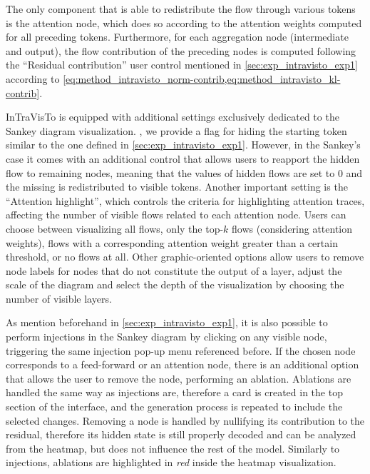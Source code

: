 The only component that is able to redistribute the flow through various tokens is the attention node, which does so according to the attention weights computed for all preceding tokens.
Furthermore, for each aggregation node (intermediate and output), the flow contribution of the preceding nodes is computed following the ``Residual contribution'' user control mentioned in \cref{sec:exp_intravisto_exp1} according to \cref{eq:method_intravisto_norm-contrib,eq:method_intravisto_kl-contrib}.

InTraVisTo is equipped with additional settings exclusively dedicated to the Sankey diagram visualization.
, we provide a flag for hiding the starting token similar to the one defined in \cref{sec:exp_intravisto_exp1}.
However, in the Sankey's case it comes with an additional control that allows users to reapport the hidden flow to remaining nodes, meaning that the values of hidden flows are set to $0$ and the missing  is redistributed to visible tokens.
Another important setting is the ``Attention highlight'', which controls the criteria for highlighting attention traces, affecting the number of visible flows related to each attention node.
Users can choose between visualizing all flows, only the top-$k$ flows (considering attention weights),  flows with a corresponding attention weight greater than a certain threshold, or no flows at all.
Other graphic-oriented options allow users to remove node labels for nodes that do not constitute the output of a layer, adjust the scale of the diagram and select the depth of the visualization by choosing the number of visible layers.

As mention beforehand in \cref{sec:exp_intravisto_exp1}, it is also possible to perform injections in the Sankey diagram by clicking on any visible node, triggering the same injection pop-up menu referenced before.
If the chosen node corresponds to a feed-forward  or an attention node, there is an additional option that allows the user to remove the node, performing an ablation.
Ablations are handled the same way as injections are, therefore a card is created in the top section of the interface, and the generation process is repeated to include the selected changes.
Removing a node is handled by nullifying its contribution to the residual, therefore its hidden state is still properly decoded and can be analyzed from the heatmap, but does not influence the rest of the model.
Similarly to injections, ablations are highlighted in \emph{red} inside the heatmap visualization.

